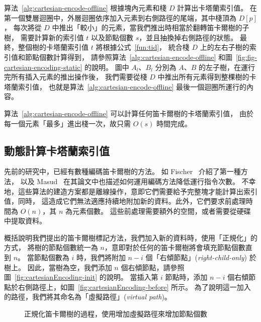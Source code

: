 算法~\ref{alg:cartesian-encode-offline} 根據塊內元素和棧 $D$ 計算出卡塔蘭索引值。
在第一個雙層迴圈中，外層迴圈依序加入元素到右側路徑的尾端，其中棧頂為 $D[p]$，
每次將從 $D$ 中推出「較小」的元素，當我們推出時相當於翻轉笛卡爾樹的子樹，
需要計算新的索引值 $t$ 以及節點個數 $s$，並且抽換掉右側路徑的狀態。
最終，整個樹的卡塔蘭索引值 $t$ 將根據公式~\ref{fun:tid}，
統合棧 $D$ 上的左右子樹的索引值和節點個數計算得到，
請參照算法~\ref{alg:cartesian-encode-offline} 和圖~\ref{fig:fig-cartesian-encoding-static} 的說明。
圖中 $A_l$、$B_l$ 分別為 $A$、$B$ 的左子樹，在運行完所有插入元素的推出操作後，
我們需要從棧 $D$ 中推出所有元素得到整棵樹的卡塔蘭索引值，
也就是算法~\ref{alg:cartesian-encode-offline} 最後一個迴圈所運行的內容。


算法~\ref{alg:cartesian-encode-offline} 可以計算任何笛卡爾樹的卡塔蘭索引值，
由於每一個元素「最多」進出棧一次，故只需 $O(s)$ 時間完成。

\subsection{動態計算卡塔蘭索引值} \label{sec:dynamic}

先前的研究中，已經有數種編碼笛卡爾樹的方法。
如 Fischer~\cite{Fischer2006TheoreticalAP} 介紹了第一種方法，
以及 Masud~\cite{Hasan2010CacheOA} 在其論文中也描述如何運用編碼方法降低運行指令次數。
不幸地，這些算法的建造方案都是離線操作，意即它們需要給予完整塊才能計算出索引值，同時，
這造成它們無法適應持續地附加新的資料。此外，它們要求前處理時間為 $O(n)$，其 $n$ 為元素個數。
這些前處理需要額外的空間，或者需要從硬碟中提取資料。

概括說明我們提出的笛卡爾樹標記方法，我們加入新的資料時，使用「正規化」的方式，
將樹的節點個數統一為 $n$，意即對於任何的笛卡爾樹將會填充節點個數直到 $n$。
當節點個數為 $i$ 時，我們將附加 $n-i$ 個「右傾節點」({\em right-child-only}) 於樹上。
因此，當樹為空，我們添加 $n$ 個右傾節點，請參照圖~\ref{fig:cartesianEncoding-init} 的說明。
當插入第 $i$ 節點時，添加 $n-i$ 個右傾節點於右側路徑上，如圖~\ref{fig:cartesianEncoding-before} 所示。
為了說明這一加入的路徑，我們將其命名為「虛擬路徑」({\em virtual path})。

\begin{figure*}[!thb]
  \centering {}  
  \caption{正規化笛卡爾樹的過程，使用增加虛擬路徑來增加節點個數}
  \label{fig:cartesianEncoding}
\end{figure*}


